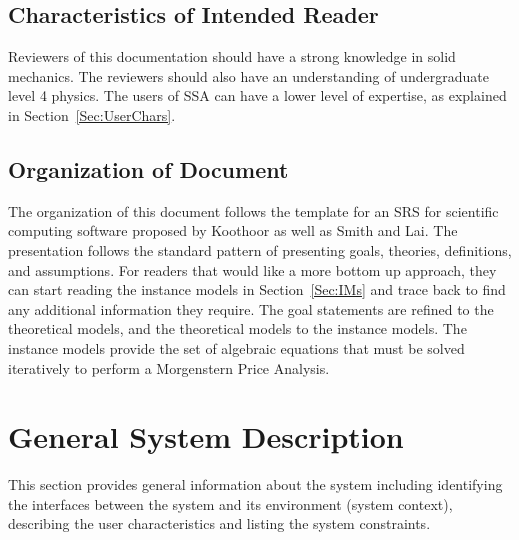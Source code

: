 \documentclass[12pt]{article}
\begin{document}
\subsection{Characteristics of Intended Reader}
\label{Sec:ReaderChars}
Reviewers of this documentation should have a strong knowledge in solid mechanics. The reviewers should also have an understanding of undergraduate level 4 physics. The users of SSA can have a lower level of expertise, as explained in Section~\ref{Sec:UserChars}.
\subsection{Organization of Document}
\label{Sec:DocOrg}
The organization of this document follows the template for an SRS for scientific computing software proposed by Koothoor as well as Smith and Lai. The presentation follows the standard pattern of presenting goals, theories, definitions, and assumptions. For readers that would like a more bottom up approach, they can start reading the instance models in Section~\ref{Sec:IMs} and trace back to find any additional information they require.
The goal statements are refined to the theoretical models, and the theoretical models to the instance models. The instance models provide the set of algebraic equations that must be solved iteratively to perform a Morgenstern Price Analysis.
\section{General System Description}
\label{Sec:GenSysDesc}
This section provides general information about the system including identifying the interfaces between the system and its environment (system context), describing the user characteristics and listing the system constraints.
\end{document}
